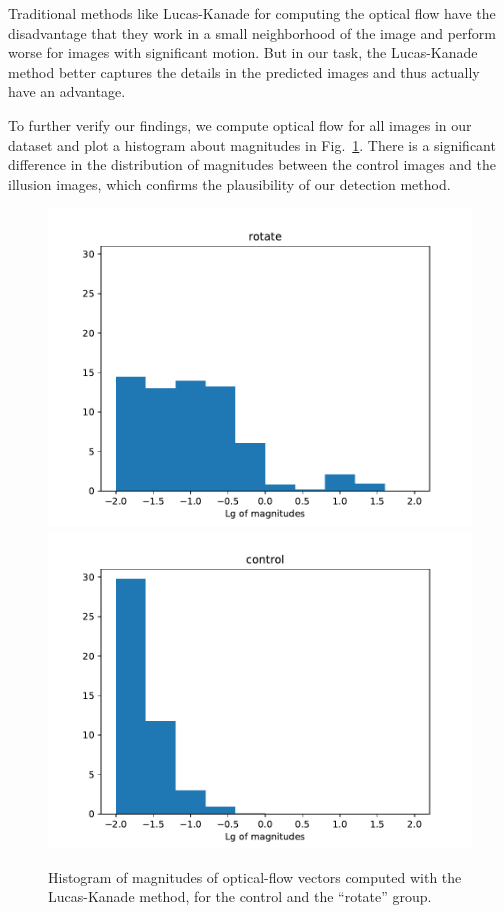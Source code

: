 \documentclass[journal]{IEEEtran}
\begin{document}
Traditional methods like Lucas-Kanade for computing the optical flow have the disadvantage that they work in a small neighborhood of the image and perform worse for images with significant motion. But in our task, the Lucas-Kanade method better captures the details in the predicted images and thus actually have an advantage.

To further verify our findings, we compute optical flow for all images in our dataset and plot a histogram about magnitudes in Fig.~\ref{fig:histogram-of-magnitudes}. There is a significant difference in the distribution of magnitudes between the control images and the illusion images, which confirms the plausibility of our detection method.

\begin{figure}[t]
  \centering
  \includegraphics[width=\linewidth]{fig/flow-mag-plot-rotate.pdf}
  \includegraphics[width=\linewidth]{fig/flow-mag-plot-control.pdf}
  \caption{Histogram of magnitudes of optical-flow vectors computed with the Lucas-Kanade method, for the control and the ``rotate'' group.}
  \label{fig:histogram-of-magnitudes}
\end{figure}
\end{document}
